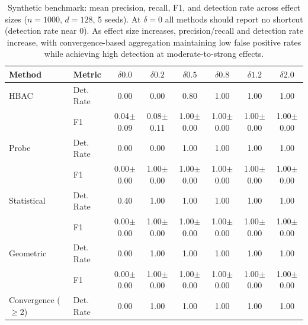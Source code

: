 \begin{table}[ht]
\centering
\scriptsize
\caption{Synthetic benchmark: mean precision, recall, F1, and detection rate across effect sizes ($n{=}1000$, $d{=}128$, 5 seeds). At $\delta{=}0$ all methods should report no shortcut (detection rate near 0). As effect size increases, precision/recall and detection rate increase, with convergence-based aggregation maintaining low false positive rates while achieving high detection at moderate-to-strong effects.}
\label{tab:synthetic_pr}
\begin{tabular}{llcccccc}
\hline
\textbf{Method} & \textbf{Metric} & $\delta{0.0}$ & $\delta{0.2}$ & $\delta{0.5}$ & $\delta{0.8}$ & $\delta{1.2}$ & $\delta{2.0}$ \\
\hline
HBAC & Det. Rate & 0.00 & 0.00 & 0.80 & 1.00 & 1.00 & 1.00 \\
 & F1 & 0.04$\pm$0.09 & 0.08$\pm$0.11 & 1.00$\pm$0.00 & 1.00$\pm$0.00 & 1.00$\pm$0.00 & 1.00$\pm$0.00 \\
Probe & Det. Rate & 0.00 & 0.00 & 1.00 & 1.00 & 1.00 & 1.00 \\
 & F1 & 0.00$\pm$0.00 & 1.00$\pm$0.00 & 1.00$\pm$0.00 & 1.00$\pm$0.00 & 1.00$\pm$0.00 & 1.00$\pm$0.00 \\
Statistical & Det. Rate & 0.40 & 1.00 & 1.00 & 1.00 & 1.00 & 1.00 \\
 & F1 & 0.00$\pm$0.00 & 1.00$\pm$0.00 & 1.00$\pm$0.00 & 1.00$\pm$0.00 & 1.00$\pm$0.00 & 1.00$\pm$0.00 \\
Geometric & Det. Rate & 0.00 & 1.00 & 1.00 & 1.00 & 1.00 & 1.00 \\
 & F1 & 0.00$\pm$0.00 & 1.00$\pm$0.00 & 1.00$\pm$0.00 & 1.00$\pm$0.00 & 1.00$\pm$0.00 & 1.00$\pm$0.00 \\
\hline
Convergence ($\geq$2) & Det. Rate & 0.00 & 1.00 & 1.00 & 1.00 & 1.00 & 1.00 \\
\hline
\end{tabular}
\end{table}